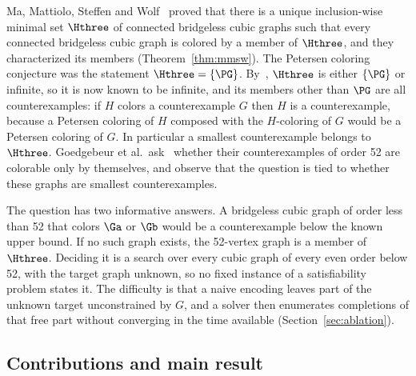 Ma, Mattiolo, Steffen and Wolf~\cite{MMSW2025} proved that there is a unique inclusion-wise
minimal set $\Hthree$ of connected bridgeless cubic graphs such that every connected bridgeless
cubic graph is colored by a member of $\Hthree$, and they characterized its members
(Theorem~\ref{thm:mmsw}). The Petersen coloring conjecture was the statement $\Hthree = \{\PG\}$.
By~\cite{MMSW2025}, $\Hthree$ is either $\{\PG\}$ or infinite, so it is now known to be infinite, and
its members other than $\PG$ are all counterexamples: if $H$ colors a counterexample $G$ then $H$ is
a counterexample, because a Petersen coloring of $H$ composed with the $H$-coloring of $G$ would be
a Petersen coloring of $G$. In particular a smallest counterexample belongs to $\Hthree$.
Goedgebeur et al.\ ask~\cite[Section~5.4]{GJMMMU2026} whether their counterexamples of order 52
are colorable only by themselves, and observe that the question is tied to whether these graphs
are smallest counterexamples.

The question has two informative answers. A bridgeless cubic graph of order less than 52 that
colors $\Ga$ or $\Gb$ would be a counterexample below the known upper bound. If no such graph
exists, the 52-vertex graph is a member of $\Hthree$. Deciding it is a search over every cubic graph
of every even order below 52, with the target graph unknown, so no fixed instance of a satisfiability
problem states it. The difficulty is that a naive encoding leaves part of the unknown target
unconstrained by $G$, and a solver then enumerates completions of that free part without converging in the time available
(Section~\ref{sec:ablation}).

\subsection{Contributions and main result}

